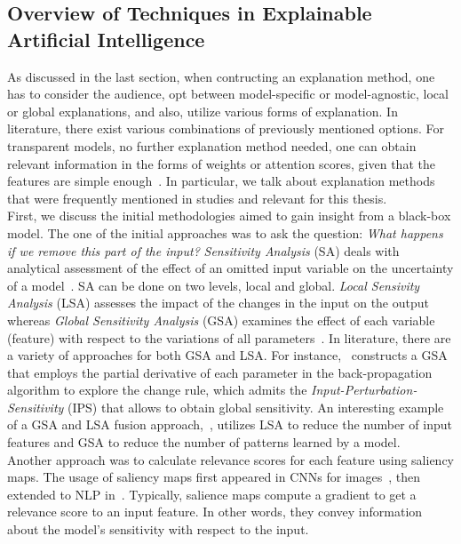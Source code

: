 \subsection{Overview of Techniques in Explainable Artificial Intelligence}
\label{subsec:xai_overview}
As discussed in the last section, when contructing an explanation method, one has to consider the audience,
opt between model-specific or model-agnostic, local or global explanations, and also, utilize various forms
of explanation. In literature, there exist various combinations of previously mentioned options. For transparent models, no further explanation method needed, one can obtain relevant information in
the forms of weights or attention scores, given that the features are simple enough~\parencite{XAIConceptsTaxonomies_Arrieta}. In particular, we talk about explanation methods that were frequently mentioned
in studies and relevant for this thesis.\\
First, we discuss the initial methodologies aimed to gain insight from a black-box model. The one of the initial approaches was to ask the question: \emph{What happens if we remove this part of the input?} \emph{Sensitivity Analysis} (SA) deals with analytical assessment of the effect of an omitted input variable on the uncertainty of a model~\parencite{SensitivityAndGeneralizationInNNs_Novak}. SA can be done on two levels, local and global. \emph{Local Sensivity Analysis} (LSA) assesses the impact of the changes in the input on the output whereas \emph{Global Sensitivity Analysis} (GSA) examines the effect of each variable (feature) with respect to the variations of all parameters~\parencite{InputPerturbationSensitivity_Rao}. In literature, there are a variety of approaches for both GSA and LSA. For instance,~\cite{SensitivityAndGeneralizationInNNs_Novak} constructs a GSA that employs the partial derivative of each parameter in the back-propagation algorithm to explore the change rule, which admits the \emph{Input-Perturbation-Sensitivity} (IPS) that allows to obtain global sensitivity. An interesting example of a GSA and LSA fusion approach,~\cite{SensitivityAnalysisForPNNs_Kowalski}, utilizes LSA to reduce the number of input features and GSA to reduce the number of patterns learned by a model.\\
Another approach was to calculate relevance scores for each feature using saliency maps. The usage of saliency maps first appeared in CNNs for images~\parencite{DeepInsideCNNs_Simonyan}, then extended to NLP in~\cite{AskTheGRU_Trapit, ExtractionOfSalientSentences_Denil}. Typically, salience maps compute a gradient to get a relevance score to an input feature. In other words, they convey information about the model's sensitivity with respect to the input.\\
